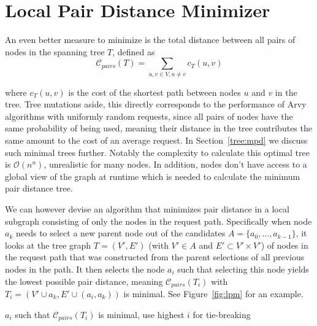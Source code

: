 \documentclass[a4paper, oneside]{discothesis}
\begin{document}
\section{Local Pair Distance Minimizer}

An even better measure to minimize is the total distance between all pairs of nodes in the spanning tree $T$, defined as
\begin{equation}
\mathcal{C}_{pairs}(T) = \sum_{u,v\in V, u\neq v}c_T(u,v)
\end{equation}

where $c_T(u,v)$ is the cost of the shortest path between nodes $u$ and $v$ in the tree. Tree mutations aside, this directly corresponds to the performance of Arvy algorithms with uniformly random requests, since all pairs of nodes have the same probability of being used, meaning their distance in the tree contributes the same amount to the cost of an average request. In Section~\ref{tree:mpd} we discuss such minimal trees further. Notably the complexity to calculate this optimal tree is $\mathcal{O}(n^n)$, unrealistic for many nodes. In addition, nodes don't have access to a global view of the graph at runtime which is needed to calculate the minimum pair distance tree.

We can however devise an algorithm that minimizes pair distance in a local subgraph consisting of only the nodes in the request path. Specifically when node $a_{k}$ needs to select a new parent node out of the candidates $A=\{a_{0},\dots,a_{k-1}\}$, it looks at the tree graph $T=(V',E')$ (with $V'\in A$ and $E'\subset V'\times V'$) of nodes in the request path that was constructed from the parent selections of all previous nodes in the path. It then selects the node $a_{i}$ such that selecting this node yields the lowest possible pair distance, meaning $\mathcal{C}_{pairs}(T_i)$ with $T_i=(V'\cup a_{k},E'\cup(a_{i},a_{k}))$ is minimal. See Figure~\ref{fig:lpm} for an example.

\begin{algorithmic}
\State\Return$a_{i}$ such that $\mathcal{C}_{pairs}(T_i)$ is minimal, use highest $i$ for tie-breaking
\EndFunction
\end{algorithmic}
\end{document}
